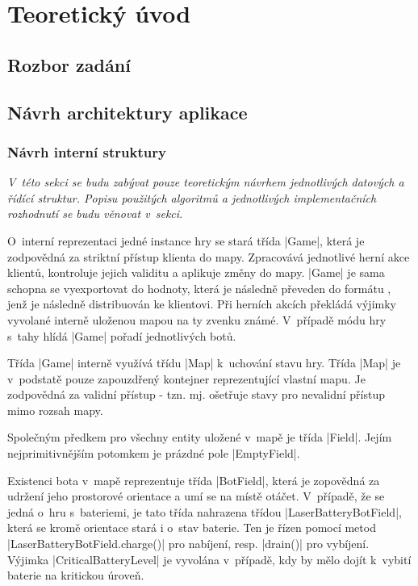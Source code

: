 
\section{Teoretický úvod}

\subsection{Rozbor zadání}
\subsection{Návrh architektury aplikace}

\subsubsection{Návrh interní struktury}

\textit{
	V~této sekci se budu zabývat pouze teoretickým návrhem jednotlivých datových a řídící struktur. Popisu použitých algoritmů a jednotlivých implementačních rozhodnutí se budu věnovat v~sekci.
}

O~interní reprezentaci jedné instance hry se stará třída \ic|Game|, která je zodpovědná za striktní přístup klienta do mapy. Zpracovává jednotlivé herní akce klientů, kontroluje jejich validitu a aplikuje změny do mapy. \ic|Game| je sama schopna se vyexportovat do hodnoty, která je následně převeden do formátu , jenž je následně distribuován ke klientovi. Při herních akcích překládá výjimky vyvolané interně uloženou mapou na ty zvenku známé. V~případě módu hry s~tahy hlídá \ic|Game| pořadí jednotlivých botů.

Třída \ic|Game| interně využívá třídu \ic|Map| k~uchování stavu hry. Třída \ic|Map| je v~podstatě pouze zapouzdřený kontejner reprezentující vlastní mapu. Je zodpovědná za validní přístup - tzn. mj. ošetřuje stavy pro nevalidní přístup mimo rozsah mapy.

Společným předkem pro všechny entity uložené v~mapě je třída \ic|Field|. Jejím nejprimitivnějším potomkem je prázdné pole \ic|EmptyField|.

\begin{sloppypar}
	Existenci bota v~mapě reprezentuje třída \ic|BotField|, která je zopovědná za udržení jeho prostorové orientace a umí se na místě otáčet. V~případě, že se jedná o~hru s~bateriemi, je tato třída nahrazena třídou \ic|LaserBatteryBotField|, která se kromě orientace stará i o~stav baterie. Ten je řízen pomocí metod \ic|LaserBatteryBotField.charge()| pro nabíjení, resp. \ic|drain()| pro vybíjení. Výjimka \ic|CriticalBatteryLevel| je vyvolána v~případě, kdy by mělo dojít k~vybití baterie na kritickou úroveň.
\end{sloppypar}

